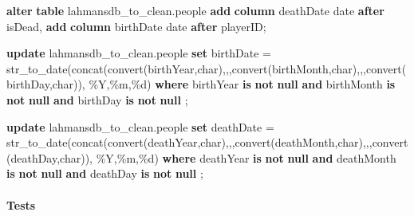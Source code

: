\documentclass[11pt]{article}
\newenvironment{Shaded}{}{}
\newcommand{\KeywordTok}[1]{\textcolor[rgb]{0.00,0.44,0.13}{\textbf{{#1}}}}
\newcommand{\DataTypeTok}[1]{\textcolor[rgb]{0.56,0.13,0.00}{{#1}}}
\newcommand{\StringTok}[1]{\textcolor[rgb]{0.25,0.44,0.63}{{#1}}}
\newcommand{\FunctionTok}[1]{\textcolor[rgb]{0.02,0.16,0.49}{{#1}}}
\newcommand{\NormalTok}[1]{{#1}}
\newcommand{\OperatorTok}[1]{\textcolor[rgb]{0.40,0.40,0.40}{{#1}}}
\begin{document}
    \begin{Shaded}
\begin{Highlighting}[]
\KeywordTok{alter} \KeywordTok{table}\NormalTok{ lahmansdb\_to\_clean.people}
\KeywordTok{add} \KeywordTok{column}\NormalTok{ deathDate }\DataTypeTok{date} \KeywordTok{after}\NormalTok{ isDead,}
\KeywordTok{add} \KeywordTok{column}\NormalTok{ birthDate }\DataTypeTok{date} \KeywordTok{after}\NormalTok{ playerID;}

\KeywordTok{update}\NormalTok{ lahmansdb\_to\_clean.people}
\KeywordTok{set}\NormalTok{ birthDate }\OperatorTok{=}\NormalTok{ str\_to\_date(}\FunctionTok{concat}\NormalTok{(}\FunctionTok{convert}\NormalTok{(birthYear,}\DataTypeTok{char}\NormalTok{),}\StringTok{\textquotesingle{},\textquotesingle{}}\NormalTok{,}\FunctionTok{convert}\NormalTok{(birthMonth,}\DataTypeTok{char}\NormalTok{),}\StringTok{\textquotesingle{},\textquotesingle{}}\NormalTok{,}\FunctionTok{convert}\NormalTok{(birthDay,}\DataTypeTok{char}\NormalTok{)), }\StringTok{\textquotesingle{}\%Y,\%m,\%d\textquotesingle{}}\NormalTok{)}
\KeywordTok{where}\NormalTok{ birthYear }\KeywordTok{is} \KeywordTok{not} \KeywordTok{null} \KeywordTok{and}\NormalTok{ birthMonth }\KeywordTok{is} \KeywordTok{not} \KeywordTok{null}  \KeywordTok{and}\NormalTok{ birthDay }\KeywordTok{is} \KeywordTok{not} \KeywordTok{null}\NormalTok{ ;}

\KeywordTok{update}\NormalTok{ lahmansdb\_to\_clean.people}
\KeywordTok{set}\NormalTok{ deathDate }\OperatorTok{=}\NormalTok{ str\_to\_date(}\FunctionTok{concat}\NormalTok{(}\FunctionTok{convert}\NormalTok{(deathYear,}\DataTypeTok{char}\NormalTok{),}\StringTok{\textquotesingle{},\textquotesingle{}}\NormalTok{,}\FunctionTok{convert}\NormalTok{(deathMonth,}\DataTypeTok{char}\NormalTok{),}\StringTok{\textquotesingle{},\textquotesingle{}}\NormalTok{,}\FunctionTok{convert}\NormalTok{(deathDay,}\DataTypeTok{char}\NormalTok{)), }\StringTok{\textquotesingle{}\%Y,\%m,\%d\textquotesingle{}}\NormalTok{)}
\KeywordTok{where}\NormalTok{ deathYear }\KeywordTok{is} \KeywordTok{not} \KeywordTok{null} \KeywordTok{and}\NormalTok{ deathMonth }\KeywordTok{is} \KeywordTok{not} \KeywordTok{null} \KeywordTok{and}\NormalTok{ deathDay }\KeywordTok{is} \KeywordTok{not} \KeywordTok{null}\NormalTok{ ;}
\end{Highlighting}
\end{Shaded}

    \hypertarget{tests}{%
\paragraph{Tests}\label{tests}}
\end{document}
